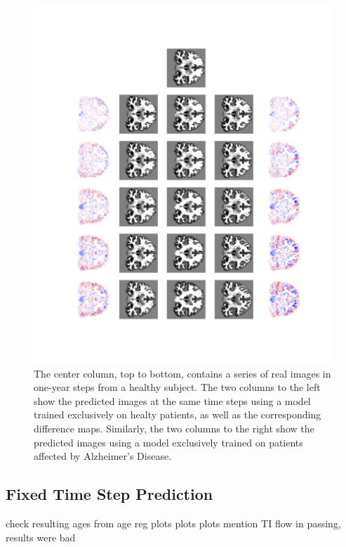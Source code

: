 \begin{figure}
	\centering
	\includegraphics[width=\linewidth, trim={100 100 66 30}, clip]{images/HC_AD_plots/comp_ADNI_137014}
	\vspace*{-15pt}
	\caption{The center column, top to bottom, contains a series of real images in one-year steps from a healthy subject. The two columns to the left show the predicted images at the same time steps using a model trained exclusively on healty patients, as well as the corresponding difference maps. Similarly, the two columns to the right show the predicted images using a model exclusively trained on patients affected by Alzheimer's Disease.}
	\label{fig:hcad_hc}
\end{figure}


\subsection{Fixed Time Step Prediction}
check resulting ages from age reg
plots plots plots
mention TI flow in passing, results were bad


